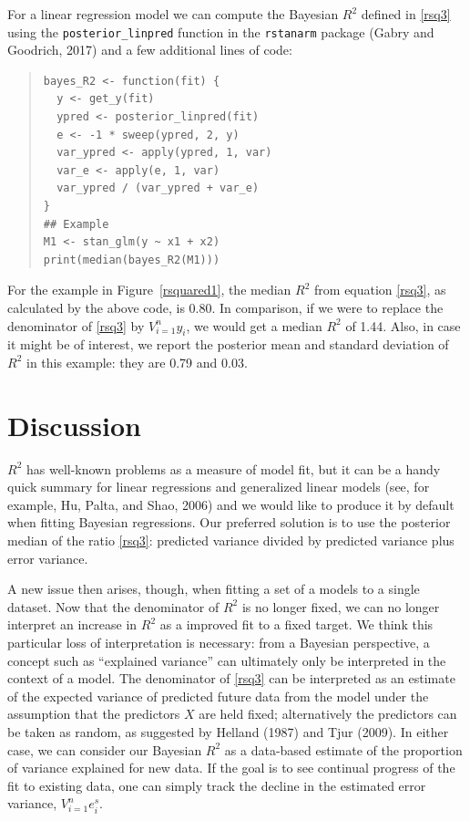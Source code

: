 \documentclass[11pt]{article}
\begin{document}
For a linear regression model we can compute the Bayesian $R^2$ defined in
\eqref{rsq3} using the \verb#posterior_linpred# function in the {\tt rstanarm}
package (Gabry and Goodrich, 2017) and a few additional lines of code:
%
\vspace{-\baselineskip}
\begin{quotation}
\noindent
\begin{small}
\begin{verbatim}
bayes_R2 <- function(fit) {
  y <- get_y(fit)
  ypred <- posterior_linpred(fit)
  e <- -1 * sweep(ypred, 2, y)
  var_ypred <- apply(ypred, 1, var)
  var_e <- apply(e, 1, var)
  var_ypred / (var_ypred + var_e)
}
## Example
M1 <- stan_glm(y ~ x1 + x2)
print(median(bayes_R2(M1)))
\end{verbatim}
\end{small}
\end{quotation}
%
For the example in Figure~\ref{rsquared1}, the median $R^2$ from
equation \eqref{rsq3}, as calculated by the above code, is 0.80.  In comparison,
if we were to replace the denominator of \eqref{rsq3} by $V_{i=1}^n y_i$, we
would get a median $R^2$ of 1.44.  Also, in case it might be of interest, we
report the posterior mean and standard deviation of $R^2$ in this example:
they are 0.79 and 0.03.

\section{Discussion}
$R^2$ has well-known problems as a measure of model fit, but it can be a handy
quick summary for linear regressions and generalized linear models (see, for
example, Hu, Palta, and Shao, 2006) and we would like to produce it by default
when fitting Bayesian regressions.  Our preferred solution is to use the
posterior median of the ratio \eqref{rsq3}:  predicted variance divided by
predicted variance plus error variance.

A new issue then arises, though, when fitting a set of a models to a single
dataset.  Now that the denominator of $R^2$ is no longer fixed, we can no longer
interpret an increase in $R^2$ as a improved fit to a fixed target.  We think
this particular loss of interpretation is necessary:  from a Bayesian
perspective, a concept such as ``explained variance'' can ultimately only be
interpreted in the context of a model.  The denominator of \eqref{rsq3} can be
interpreted as an estimate of the expected variance of predicted future data
from the model under the assumption that the predictors $X$ are held fixed;
alternatively the predictors can be taken as random, as suggested by Helland
(1987) and Tjur (2009).  In either case, we can consider our Bayesian $R^2$ as a
data-based estimate of the proportion of variance explained for new data. If the
goal is to see continual progress of the fit to existing data, one can simply
track the decline in the estimated error variance, $V_{i=1}^n e_i^s$.
\end{document}
